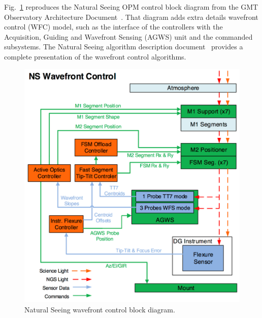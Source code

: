 \documentclass{gmto}
\begin{document}
Fig.~\ref{fig:ns-ctrl} reproduces the Natural Seeing OPM control block diagram from the GMT Observatory Architecture Document~\cite{OAD}. That diagram adds extra details wavefront control (WFC) model, such as the interface of the controllers with the  Acquisition, Guiding and Wavefront Sensing (AGWS) unit and the commanded subsystems. The Natural Seeing algorithm description document~\cite{GMTO.NS.Alg.DOC} provides a complete presentation of the wavefront control algorithms.
\begin{figure}[!htb]
  \centering
  \includegraphics[width=0.7\linewidth]{ns-control.png}
  \caption{Natural Seeing wavefront control block diagram.}
  \label{fig:ns-ctrl}
\end{figure}


\end{document}
